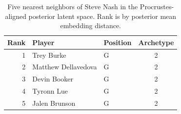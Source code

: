 \begin{table}[htbp]
  \centering\small
  \begin{tabular}{rllc}
    \toprule
    Rank & Player & Position & Archetype \\
    \midrule
    1 & Trey Burke & G & 2 \\
    2 & Matthew Dellavedova & G & 2 \\
    3 & Devin Booker & G & 2 \\
    4 & Tyronn Lue & G & 2 \\
    5 & Jalen Brunson & G & 2 \\
    \bottomrule
  \end{tabular}
  \caption{Five nearest neighbors of Steve Nash in the Procrustes-aligned posterior latent space. Rank is by posterior mean embedding distance.}
  \label{tab:Steve_Nash_neighbors}
\end{table}


